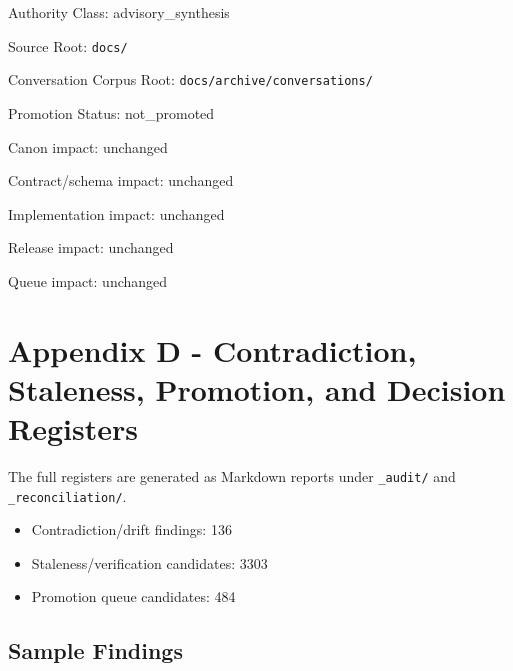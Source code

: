 \documentclass[9pt,a4paper]{book}
\begin{document}
Authority Class: advisory\_\allowbreak{}synthesis

Source Root: \texttt{docs/\allowbreak{}}

Conversation Corpus Root: \texttt{docs/\allowbreak{}archive/\allowbreak{}conversations/\allowbreak{}}

Promotion Status: not\_\allowbreak{}promoted

Canon impact: unchanged

Contract/\allowbreak{}schema impact: unchanged

Implementation impact: unchanged

Release impact: unchanged

Queue impact: unchanged


\part{Appendix D -\allowbreak{} Contradiction, Staleness, Promotion, and Decision Registers}

The full registers are generated as Markdown reports under \texttt{\_\allowbreak{}audit/\allowbreak{}} and \texttt{\_\allowbreak{}reconciliation/\allowbreak{}}.\allowbreak{}


\begin{itemize}
\item Contradiction/\allowbreak{}drift findings: 136
\item Staleness/\allowbreak{}verification candidates: 3303
\item Promotion queue candidates: 484
\end{itemize}

\chapter{Sample Findings}
\end{document}
